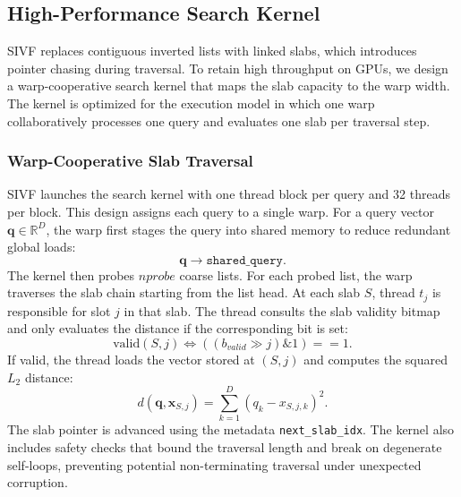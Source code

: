 \documentclass[sigconf,nonacm]{acmart}
\theoremstyle{plain}
\theoremstyle{definition}
\theoremstyle{remark}
\begin{document}
\subsection{High-Performance Search Kernel}
\label{sec:methods_search_kernel}

SIVF replaces contiguous inverted lists with linked slabs, which introduces pointer chasing during traversal. To retain high throughput on GPUs, we design a warp-cooperative search kernel that maps the slab capacity to the warp width. The kernel is optimized for the execution model in which one warp collaboratively processes one query and evaluates one slab per traversal step.

\subsubsection{Warp-Cooperative Slab Traversal}

SIVF launches the search kernel with one thread block per query and 32 threads per block. This design assigns each query to a single warp. For a query vector $\mathbf{q} \in \mathbb{R}^D$, the warp first stages the query into shared memory to reduce redundant global loads:
\[
\mathbf{q} \rightarrow \texttt{shared\_query}.
\]
The kernel then probes $nprobe$ coarse lists. For each probed list, the warp traverses the slab chain starting from the list head. At each slab $S$, thread $t_j$ is responsible for slot $j$ in that slab. The thread consults the slab validity bitmap and only evaluates the distance if the corresponding bit is set:
\begin{equation}
\label{eq:slot_valid}
\text{valid}(S,j) \Leftrightarrow \left( (b_{valid} \gg j) \mathbin{\&} 1 \right) == 1.
\end{equation}
If valid, the thread loads the vector stored at $(S,j)$ and computes the squared $L_2$ distance:
\begin{equation}
\label{eq:l2}
d(\mathbf{q}, \mathbf{x}_{S,j}) = \sum_{k=1}^{D} (q_k - x_{S,j,k})^2.
\end{equation}
The slab pointer is advanced using the metadata \texttt{next\_slab\_idx}. The kernel also includes safety checks that bound the traversal length and break on degenerate self-loops, preventing potential non-terminating traversal under unexpected corruption.

\end{document}

